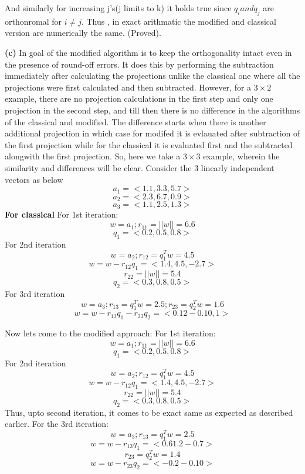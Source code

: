 \documentclass{article}
\renewcommand\part[1]{\vspace{.10in}\textbf{(#1)}}
\begin{document}
 And similarly for increasing j's(j limits to k) it holds true since $q_i and q_j$ are orthonromal for $i\neq j$. Thus , in exact arithmatic the modified and classical version are numerically the same. (Proved). \newline

 \part{c} In goal of the modified algorithm is to keep the orthogonality intact even in the presence of round-off errors. It does this by performing the subtraction immediately after calculating the projections unlike the classical one where all the projections were first calculated and then subtracted. However, for a $3\times2$ example, there are no projection calculations in the first step and only one projection in the second step, and till then there is no difference in the algorithms of the classical and modified. The difference starts when there is another additional projection in which case for modifed it is evlauated after subtraction of the first projection while for the classical it is evaluated first and the subtracted alongwith the first projection. \newline
 So, here we take a $3\times 3$ example, wherein the similarity and differences will be clear. Consider the 3 linearly independent vectors as below \newline
 \[ a_1 = <1.1, 3.3, 5.7>\]
 \[ a_2 = <2.3, 6.7, 0.9>\]
 \[ a_3 = <1.1, 2.5, 1.3>\]
 \textbf {For classical} \newline
 For 1st iteration: 
 \[w = a_1; r_{11} = ||w|| = 6.6\]
 \[ q_1 = <0.2, 0.5, 0.8>    \]
 For 2nd iteration
 \[w = a_2; r_{12} = q_{1}^Tw = 4.5    \]
 \[w = w - r_{12}q_1 = <1.4, 4.5, -2.7> \]
 \[r_{22} = ||w|| = 5.4    \]
 \[q_2 = <0.3, 0.8, 0.5>    \]
 For 3rd iteration
 \[w = a_3; r_{13} = q_{1}^Tw = 2.5 ; r_{23} = q_{2}^Tw = 1.6  \]
 \[w = w - r_{13}q_1 - r_{23}q_2 = <0.12 -0.1 0,1>    \]

 Now lets come to the modified approach:
 For 1st iteration: 
 \[w = a_1; r_{11} = ||w|| = 6.6\]
 \[ q_1 = <0.2, 0.5, 0.8>    \]
 For 2nd iteration
 \[w = a_2; r_{12} = q_{1}^Tw = 4.5    \]
 \[w = w - r_{12}q_1 = <1.4, 4.5, -2.7> \]
 \[r_{22} = ||w|| = 5.4    \]
 \[q_2 = <0.3, 0.8, 0.5>    \]
 Thus, upto second iteration, it comes to be exact same as expected as described earlier. \newline
 For the 3rd iteration:
 \[w = a_3; r_{13} = q_{1}^Tw = 2.5 \]
 \[w = w - r_{13}q_1 =  <0.6 1.2 -0.7>    \]
 \[r_{23} = q_{2}^Tw = 1.4   \]
 \[w = w - r_{23}q_2 = <-0.2 -0.1 0>    \]
\end{document}
